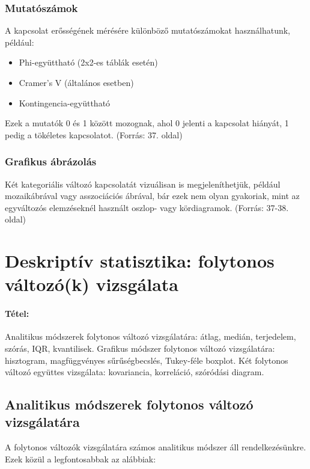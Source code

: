\documentclass[a4paper,12pt]{article}
\begin{document}
\subsubsection{Mutatószámok}

A kapcsolat erősségének mérésére különböző mutatószámokat használhatunk, például:

\begin{itemize}
    \item Phi-együttható (2x2-es táblák esetén)
    \item Cramer's V (általános esetben)
    \item Kontingencia-együttható
\end{itemize}

Ezek a mutatók 0 és 1 között mozognak, ahol 0 jelenti a kapcsolat hiányát, 1 pedig a tökéletes kapcsolatot.
(Forrás: 37. oldal)

\subsubsection{Grafikus ábrázolás}

Két kategoriális változó kapcsolatát vizuálisan is megjeleníthetjük, például mozaikábrával vagy asszociációs ábrával, bár ezek nem olyan gyakoriak, mint az egyváltozós elemzéseknél használt oszlop- vagy kördiagramok.
(Forrás: 37-38. oldal)

\newpage

\section{Deskriptív statisztika: folytonos változó(k) vizsgálata}

\paragraph{Tétel:} Analitikus módszerek folytonos változó vizsgálatára: átlag, medián, terjedelem, szórás, IQR,
kvantilisek. Grafikus módszer folytonos változó vizsgálatára: hisztogram, magfüggvényes
sűrűségbecslés, Tukey-féle boxplot. Két folytonos változó együttes vizsgálata: kovariancia,
korreláció, szóródási diagram.

\subsection{Analitikus módszerek folytonos változó vizsgálatára}

A folytonos változók vizsgálatára számos analitikus módszer áll rendelkezésünkre. Ezek közül a legfontosabbak az alábbiak:
\end{document}
